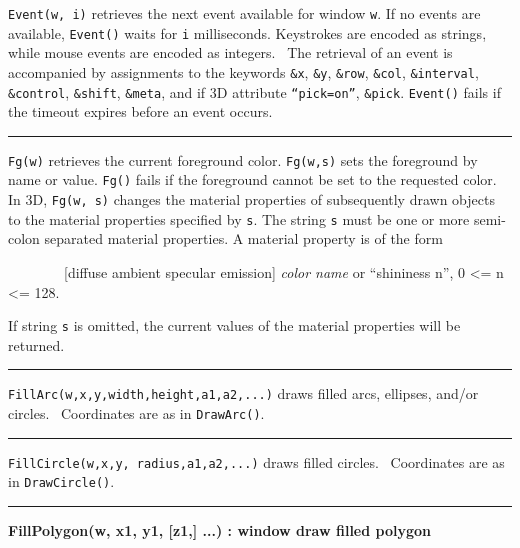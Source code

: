 \noindent
\texttt{Event(w, i)} retrieves the next event available for window
\texttt{w}. If no events are available, \texttt{Event()} waits for
\texttt{i} milliseconds. Keystrokes are encoded as strings, while mouse
events are encoded as integers. \ The retrieval of an event is
accompanied by assignments to the keywords \texttt{\&x}, \texttt{\&y},
\texttt{\&row}, \texttt{\&col}, \texttt{\&interval},
\texttt{\&control}, \texttt{\&shift}, \texttt{\&meta}, and if 3D
attribute \texttt{{\textquotedblleft}pick=on{\textquotedblright}},
\texttt{\&pick}. \texttt{Event()} fails if the timeout expires before
an event occurs.

\bigskip\hrule\vspace{0.1cm}

\noindent
\texttt{Fg(w)} retrieves the current foreground color. \texttt{Fg(w,s)}
sets the foreground by name or value. \texttt{Fg()} fails if the
foreground cannot be set to the requested color. In 3D, \texttt{Fg(w,
s)} changes the material properties of subsequently drawn objects to
the material properties specified by \texttt{s}. The string \texttt{s}
must be one or more semi-colon separated material properties. A
material property is of the form 

\ \ \ \ \ \ \ \ [diffuse {\textbar} ambient {\textbar} specular
{\textbar} emission] \textit{color name} or
{\textquotedblleft}shininess n{\textquotedblright}, 0 {\textless}= n
{\textless}= 128.

If string \texttt{s} is omitted, the current values of the material
properties will be returned.

\bigskip\hrule\vspace{0.1cm}

\noindent
\texttt{FillArc(w,x,y,width,height,a1,a2,...)} draws filled arcs,
ellipses, and/or circles. \ Coordinates are as in \texttt{DrawArc()}.

\bigskip\hrule\vspace{0.1cm}

\noindent
\texttt{FillCircle(w,x,y, radius,a1,a2,...)} draws filled circles.
\ Coordinates are as in \texttt{DrawCircle()}.

\bigskip\hrule\vspace{0.1cm}
\noindent
{\bf FillPolygon(w, x1, y1, [z1,] ...) : window \hfill draw filled polygon}

